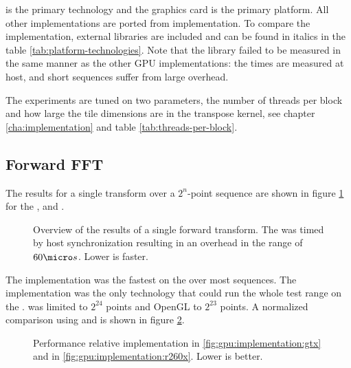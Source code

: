 {\CU} is the primary technology and the {\NVCARD} graphics card is the primary platform. All other implementations are ported from {\CU} implementation. To compare the implementation, external libraries are included and can be found in italics in the table \ref{tab:platform-technologies}. Note that the {\CLFFT} library failed to be measured in the same manner as the other GPU implementations: the times are measured at host, and short sequences suffer from large overhead.

The experiments are tuned on two parameters, the number of \glspl{thread} per \gls{block} and how large the tile dimensions are in the transpose \gls{kernel}, see chapter \ref{cha:implementation} and table \ref{tab:threads-per-block}.

\subsection{Forward FFT}

The results for a single transform over a $2^{n}$-point sequence are shown in figure \ref{fig:gpu:overview} for the {\NVCARD}, {\AMDCARD} and {\INTELCPU}.

\begin{figure}
	\centering
	\subfloat[\NVCARD]{	
		
	}
	\vfill
	\subfloat[\AMDCARD]{
		
	}
	\caption{Overview of the results of a single forward transform. The {\CLFFT} was timed by host synchronization resulting in an overhead in the range of $60{\micro}s$. Lower is faster.}
	\label{fig:gpu:overview}
\end{figure}

The {\CU} implementation was the fastest on the {\NVCARD} over most sequences. The {\OCL} implementation was the only technology that could run the whole test range on the {\AMDCARD}. {\DX} was limited to $2^{24}$ points and OpenGL to $2^{23}$ points. A normalized comparison using {\CU} and {\OCL} is shown in figure \ref{fig:gpu:implementation}.

\begin{figure}
	\centering
	\subfloat[\NVCARD\label{fig:gpu:implementation:gtx}]{	
		
	}
	\vfill
	\subfloat[\AMDCARD\label{fig:gpu:implementation:r260x}]{
		
	}	
	\caption{Performance relative {\CU} implementation in \ref{fig:gpu:implementation:gtx} and {\OCL} in \ref{fig:gpu:implementation:r260x}. Lower is better.}
	\label{fig:gpu:implementation}
\end{figure}

